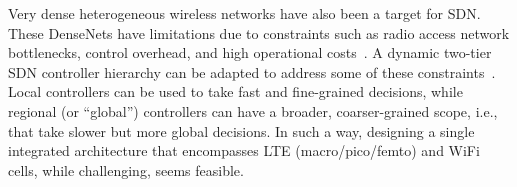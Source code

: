 

Very dense heterogeneous wireless networks have also been a target for SDN.
These DenseNets have limitations due to constraints 
such as radio access network bottlenecks, control overhead, and high operational costs~\cite{ali-ahmad2013}.
A dynamic two-tier SDN controller hierarchy can be adapted to address some of these constraints~\cite{ali-ahmad2013}. Local controllers can be used to take fast and fine-grained decisions, while regional 
(or ``global'') controllers can have a broader, coarser-grained scope, i.e., that take slower but more 
global decisions.
In such a way, designing a single integrated architecture that encompasses LTE (macro/pico/femto) and WiFi 
cells, while challenging, seems feasible. 

